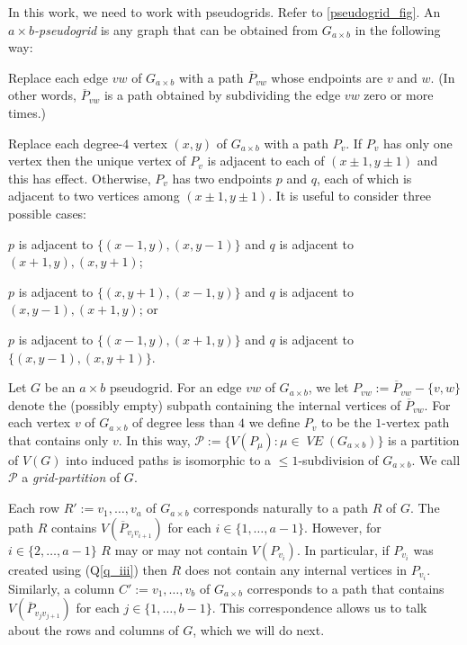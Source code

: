 \documentclass{patmorin}
\newcommand{\defin}[1]{\emph{\color{brown}#1}}
\DeclareMathOperator{\VE}{\mathit{VE}}
\begin{document}
In this work, we need to work with pseudogrids.  Refer to \cref{pseudogrid_fig}.  An \defin{$a\times b$-pseudogrid} is any graph that can be obtained from $G_{a\times b}$ in the following way:
\begin{compactitem}
  \item Replace each edge $vw$ of $G_{a\times b}$ with a path $\overline{P}_{vw}$ whose endpoints are $v$ and $w$.  (In other words, $\overline{P}_{vw}$ is a path obtained by subdividing the edge $vw$ zero or more times.)
  \item Replace each degree-$4$ vertex $(x,y)$ of $G_{a\times b}$ with a path $P_v$. If $P_v$ has only one vertex then the unique vertex of $P_v$ is adjacent to each of $(x\pm 1,y\pm 1)$ and this has effect.  Otherwise, $P_v$ has two endpoints $p$ and $q$, each of which is adjacent to two vertices among $(x\pm 1,y\pm 1)$.  It is useful to consider three possible cases:
  \begin{compactenum}[(Q1)]
    \item \label{q_i} $p$ is adjacent to $\{(x-1,y), (x,y-1)\}$ and $q$ is adjacent to $(x+1,y),(x,y+1)$;
    \item \label{q_ii} $p$ is adjacent to $\{(x,y+1), (x-1,y)\}$ and $q$ is adjacent to $(x,y-1),(x+1,y)$; or
    \item \label{q_iii} $p$ is adjacent to $\{(x-1,y),(x+1,y)\}$ and $q$ is adjacent to $\{(x,y-1),(x,y+1)\}$.
  \end{compactenum}
\end{compactitem}

Let $G$ be an $a\times b$ pseudogrid.  For an edge $vw$ of $G_{a\times b}$, we let $P_{vw}:=\overline{P}_{vw}-\{v,w\}$ denote the (possibly empty) subpath containing the internal vertices of $\overline{P}_{vw}$.  For each vertex $v$ of $G_{a\times b}$ of degree less than $4$ we define $P_{v}$ to be the $1$-vertex path that contains only $v$.  In this way, $\mathcal{P}:=\{V(P_\mu):\mu\in \VE(G_{a\times b})\}$ is a partition of $V(G)$ into induced paths is isomorphic to a $\le\! 1$-subdivision of $G_{a\times b}$.  We call $\mathcal{P}$ a \defin{grid-partition} of $G$.

Each row $R':=v_1,\ldots,v_a$ of $G_{a\times b}$ corresponds naturally to a path $R$ of $G$. The path $R$ contains $V(\overline{P}_{v_iv_{i+1}})$ for each $i\in\{1,\ldots,a-1\}$.  However, for $i\in\{2,\ldots,a-1\}$ $R$ may or may not contain $V(P_{v_i})$.  In particular, if $P_{v_i}$ was created using (Q\ref{q_iii}) then $R$ does not contain any internal vertices in $P_{v_i}$. Similarly, a column $C':=v_1,\ldots,v_b$ of $G_{a\times b}$ corresponds to a path that contains $V(\overline{P}_{v_jv_{j+1}})$ for each $j\in\{1,\ldots,b-1\}$. This correspondence allows us to talk about the rows and columns of $G$, which we will do next.
\end{document}
